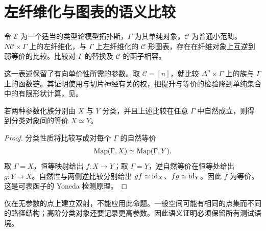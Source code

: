 \section{左纤维化与图表的语义比较}
\begin{theorem}
令 $\mathcal E$ 为一个适当的类型论模型拓扑斯，$\Gamma$ 为其单纯对象，$\mathcal C$ 为普通小范畴。$N\mathcal C\times\Gamma$ 上的左纤维化，与 $\Gamma$ 上左纤维化的 $\mathcal C$ 形图表，存在在纤维对象上互逆到弱等价的比较。比较对 $\Gamma$ 的替换及 $\mathcal C$ 的函子相容。
\end{theorem}
\begin{remark}
这一表述保留了有向单价性所需的参数。取 $\mathcal C=[n]$，就比较 $\Delta^n\times\Gamma$ 上的族与 $\Gamma$ 上的函数链。其证明使用与切片神经有关的权，把提升与等价的检验降到单纯集合中的有限形状计算，见\cite[定理4.4.4与6.2.5]{CavalloRiehlSattler}。
\end{remark}
\begin{proposition}[从族比较到宇宙比较]
若两种参数化族分别由 $X$ 与 $Y$ 分类，并且上述比较在任意 $\Gamma$ 中自然成立，则得到分类对象间的等价 $X\simeq Y$。
\end{proposition}
\begin{proof}
分类性质将比较写成对每个 $\Gamma$ 的自然等价
\[
\operatorname{Map}(\Gamma,X)\simeq\operatorname{Map}(\Gamma,Y).
\]
取 $\Gamma=X$，恒等映射给出 $f:X\to Y$；取 $\Gamma=Y$，逆自然等价在恒等处给出 $g:Y\to X$。自然性与两侧逆比较分别给出 $gf\simeq\operatorname{id}_X$、$fg\simeq\operatorname{id}_Y$。因此 $f$ 为等价。这是可表函子的 Yoneda 检测原理。
\end{proof}
\begin{remark}
仅在无参数的点上建立双射，不能应用此命题。一般空间可能有相同的点集而不同的路径结构；高阶分类对象还要记录更高参数。因此语义证明必须保留所有测试语境。
\end{remark}

